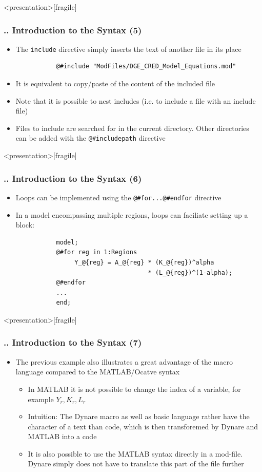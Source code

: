\documentclass[11pt,aspectratio=169]{beamer}
\begin{document}
\begin{frame}<presentation>[fragile]
	\frametitle{{\thesection.\thesubsection.\thesubsubsection} Introduction to the Syntax (5)}
	\begin{itemize}
		\item The \texttt{include} directive simply inserts the text of another file in its place
		\begin{verbatim}
		   @#include "ModFiles/DGE_CRED_Model_Equations.mod"
		\end{verbatim}
		\item It is equivalent to copy/paste of the content of the included file
		\item Note that it is possible to nest includes (i.e. to include a file with an include file)
		\item Files to include are searched for in the current directory. Other directories can be added with the \texttt{@\#includepath} directive
	\end{itemize}
\end{frame}
\begin{frame}<presentation>[fragile]
	\frametitle{{\thesection.\thesubsection.\thesubsubsection} Introduction to the Syntax (6)}
	\begin{itemize}
		\item Loops can be implemented using the \texttt{@\#for...@\#endfor} directive
		\item In a model encompassing multiple regions, loops can faciliate setting up a  block:
		\begin{verbatim}
		   model;
		   @#for reg in 1:Regions
		        Y_@{reg} = A_@{reg} * (K_@{reg})^alpha 
		                            * (L_@{reg})^(1-alpha);
		   @#endfor
		   ...
		   end;
		\end{verbatim}
	\end{itemize}
\end{frame}
\begin{frame}<presentation>[fragile]
	\frametitle{{\thesection.\thesubsection.\thesubsubsection} Introduction to the Syntax (7)}
	\begin{itemize}
		\item The previous example also illustrates a great advantage of the macro language compared to the MATLAB/Ocatve syntax 
		\begin{itemize}
			\item In MATLAB it is not possible to change the index of a variable, for example $Y_r,K_r,L_r$
			\item Intuition: The Dynare macro as well as basic language rather have the character of a text than code, which is then transforemed by Dynare and MATLAB into a code
			\item It is also possible to use the MATLAB syntax directly in a mod-file. Dynare simply does not have to translate this part of the file further
		\end{itemize}
	\end{itemize}
\end{frame}
\end{document}
